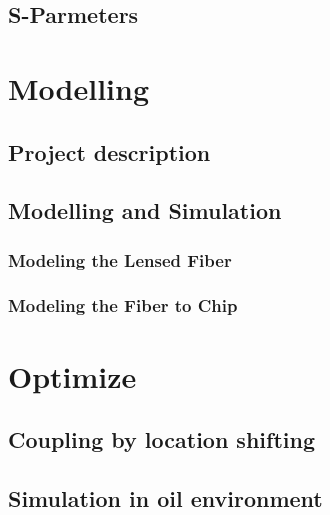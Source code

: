 \section{S-Parmeters}


\chapter{Modelling}
\label{chp:model}

\section{Project description}


\section{Modelling and Simulation}
\label{sect:model_simulation}

\subsection{Modeling the Lensed Fiber}
\label{sect:model_model_model_TLF}

\subsection{Modeling the Fiber to Chip}
\label{sect:model_model_fiber2chip}


%
\chapter{Optimize}
\label{chp:optim}


\section{Coupling by location shifting}
\label{sect:optim_shift}


\section{Simulation in oil environment}


